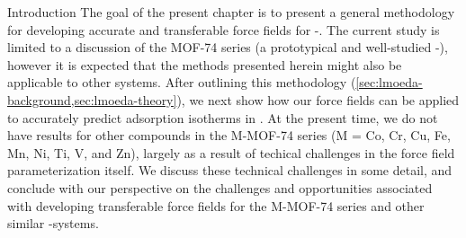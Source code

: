 \begin{section}{Introduction}
The goal of the present chapter is to present a general 
methodology for developing accurate and transferable force fields for \cus-\mofs. 
The current study is limited to a discussion of the MOF-74 series (a
prototypical and well-studied \cus-\mof), however it
is expected that the methods presented herein might also be applicable to
other systems. After outlining this methodology
(\cref{sec:lmoeda-background,sec:lmoeda-theory}), we next show how our force
fields can be applied to accurately predict \co adsorption isotherms in
\mgmof. At the present time, we do not have results for other compounds in the
M-MOF-74 series (M = Co, Cr, Cu, Fe, Mn, Ni, Ti, V, and Zn), largely as a
result of techical challenges in the force field parameterization itself.
We discuss these technical challenges in some detail, and conclude with our
perspective on the challenges and opportunities associated with developing
transferable force fields for the M-MOF-74 series and other similar \cus-\mof systems.



\end{section}




